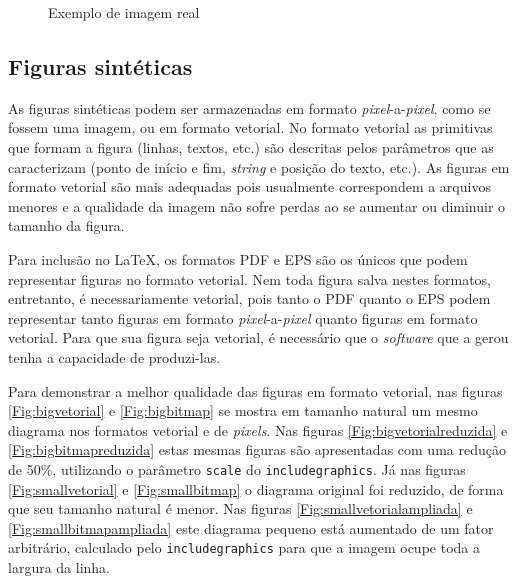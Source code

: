 \begin{figure}[htbp!] \begin{center}
\caption{Exemplo de imagem real}
\label{Fig:belmonte}
\end{center} \end{figure}

\subsection{Figuras sintéticas}
\label{Sec:figsinteticas}

As figuras sintéticas podem ser armazenadas em formato
\emph{pixel}-a-\emph{pixel}, como se fossem uma imagem, ou em
formato vetorial. No formato vetorial as primitivas que formam a
figura (linhas, textos, etc.) são descritas pelos parâmetros que as
caracterizam (ponto de início e fim, \emph{string} e posição do texto,
etc.). As figuras em formato vetorial são mais adequadas pois
usualmente correspondem a arquivos menores e a qualidade da imagem
não sofre perdas ao se aumentar ou diminuir o tamanho da figura.

Para inclusão no \LaTeX, os formatos PDF e EPS são os únicos que podem
representar figuras no formato vetorial. Nem toda figura salva nestes
formatos, entretanto, é necessariamente vetorial, pois tanto o PDF
quanto o EPS podem representar tanto figuras em formato
\emph{pixel}-a-\emph{pixel} quanto figuras em formato vetorial. Para
que sua figura seja vetorial, é necessário que o \emph{software} que a
gerou tenha a capacidade de produzi-las.

Para demonstrar a melhor qualidade das figuras em formato vetorial,
nas figuras \ref{Fig:bigvetorial} e \ref{Fig:bigbitmap} se mostra em
tamanho natural um mesmo diagrama nos formatos vetorial e de
\emph{pixels}. Nas figuras \ref{Fig:bigvetorialreduzida} e
\ref{Fig:bigbitmapreduzida} estas mesmas figuras são apresentadas
com uma redução de 50\%, utilizando o parâmetro \texttt{scale} do
\texttt{includegraphics}. Já nas figuras \ref{Fig:smallvetorial} e
\ref{Fig:smallbitmap} o diagrama original foi reduzido, de forma que
seu tamanho natural é menor. Nas figuras
\ref{Fig:smallvetorialampliada} e \ref{Fig:smallbitmapampliada}
este diagrama pequeno está aumentado de um fator arbitrário, calculado
pelo \texttt{includegraphics} para que a imagem ocupe toda a largura
da linha.


